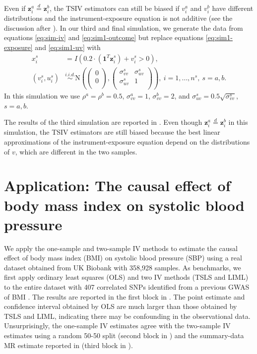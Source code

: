 \documentclass[preprint]{imsart}
\begin{document}
Even if $\mathbf{z}_i^a \overset{d}{=} \mathbf{z}_i^b$, the TSIV
estimators can still be biased if $v_i^a$ and $v_i^b$ have different
distributions and the instrument-exposure equation is not additive
(see the discussion after ). In our
third and final simulation, we generate the data from
equations \eqref{eq:sim-iv} and \eqref{eq:sim1-outcome} but replace
equations \eqref{eq:sim1-exposure} and \eqref{eq:sim1-uv} with
\begin{align}
  x_i^s &= I(0.2 \cdot (\mathbf{1}^T \mathbf{z}_i^s) + v_i^s > 0), \label{eq:sim3-exposure} \\
  (v_i^s,u_i^s) &\overset{i.i.d.}{\sim} \mathrm{N}\left(
    \begin{pmatrix}
      0 \\
      0 \\
    \end{pmatrix},
    \begin{pmatrix}
      \sigma_{vv}^s & \sigma_{uv}^s \\
      \sigma_{uv}^s & 1 \\
    \end{pmatrix}
  \right),~i=1,\dotsc,n^s,~s=a,b. \label{eq:sim3-uv}
\end{align}
In this simulation we use $\rho^a = \rho^b = 0.5$, $\sigma_{vv}^a =
1$, $\sigma_{vv}^b = 2$, and $\sigma_{uv}^s = 0.5
\sqrt{\sigma_{vv}^s}$, $s=a,b$.

The results of the third simulation are reported in
. Even though $\mathbf{z}_i^a \overset{d}{=}
\mathbf{z}_i^b$ in this simulation, the TSIV estimators are still
biased because the best linear approximations of the
instrument-exposure equation depend on the distributions of $v$, which
are different in the two samples.

\section{Application: The causal effect of body mass index on systolic
blood pressure}
\label{sec:real-data-analysis}

We apply the one-sample and two-sample IV methods to estimate the causal
effect of body mass index (BMI) on systolic blood pressure (SBP) using a real dataset
obtained from UK Biobank with 358,928 samples. As benchmarks, we first
apply ordinary least squares (OLS) and two IV methods (TSLS and LIML) to
the entire dataset with 407 correlated SNPs identified from a previous GWAS of BMI
\citep{locke2015genetic}. The results are reported in the first block
in . The point estimate and confidence interval
obtained by OLS are much larger than those obtained by TSLS and LIML,
indicating there may be confounding in the observational
data. Unsurprisingly, the one-sample IV estimates agree with the
two-sample IV estimates using a random 50-50 split (second block in
) and the
summary-data MR estimate reported in
\citet{zhao2018statistical} (third block in ).
\end{document}
